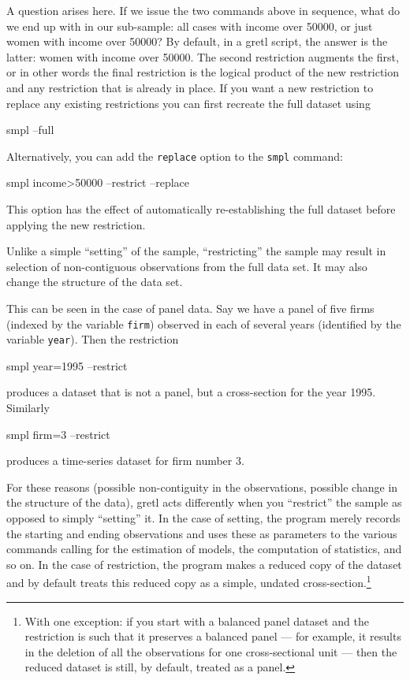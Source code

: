 A question arises here.  If we issue the two commands above in
sequence, what do we end up with in our sub-sample: all cases with
income over 50000, or just women with income over 50000? By default,
in a gretl script, the answer is the latter: women with income over
50000.  The second restriction augments the first, or in other words
the final restriction is the logical product of the new restriction
and any restriction that is already in place.  If you want a new
restriction to replace any existing restrictions you can first
recreate the full dataset using
%
\begin{code}
smpl --full
\end{code}
%
Alternatively, you can add the \verb+replace+ option to the
\verb+smpl+ command:
%
\begin{code}
smpl income>50000 --restrict --replace
\end{code}

This option has the effect of automatically re-establishing the full
dataset before applying the new restriction.

Unlike a simple ``setting'' of the sample, ``restricting'' the sample
may result in selection of non-contiguous observations from the full
data set.  It may also change the structure of the data set.

This can be seen in the case of panel data.  Say we have a panel of
five firms (indexed by the variable \verb+firm+) observed in each of
several years (identified by the variable \verb+year+).  Then the
restriction
%
\begin{code}
smpl year=1995 --restrict
\end{code}
%
produces a dataset that is not a panel, but a cross-section for the
year 1995.  Similarly
%
\begin{code}
smpl firm=3 --restrict
\end{code}
%
produces a time-series dataset for firm number 3.

For these reasons (possible non-contiguity in the observations,
possible change in the structure of the data), gretl acts differently
when you ``restrict'' the sample as opposed to simply ``setting'' it.
In the case of setting, the program merely records the starting and
ending observations and uses these as parameters to the various
commands calling for the estimation of models, the computation of
statistics, and so on. In the case of restriction, the program makes a
reduced copy of the dataset and by default treats this reduced copy as
a simple, undated cross-section.\footnote{With one exception: if you
  start with a balanced panel dataset and the restriction is such that
  it preserves a balanced panel --- for example, it results in the
  deletion of all the observations for one cross-sectional unit ---
  then the reduced dataset is still, by default, treated as a panel.}

